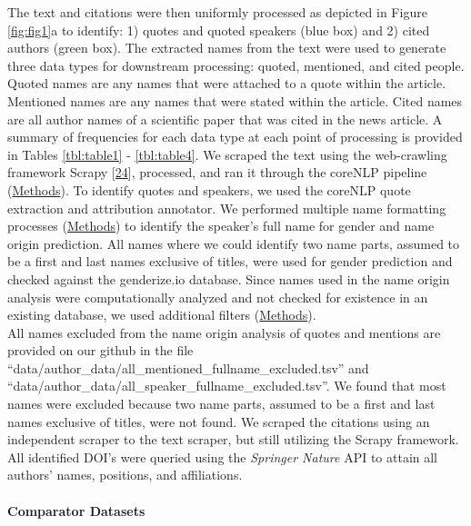The text and citations were then uniformly processed as depicted in Figure \ref{fig:fig1}a to identify: 1) quotes and quoted speakers (blue box) and 2) cited authors (green box).
The extracted names from the text were used to generate three data types for downstream processing: quoted, mentioned, and cited people.
Quoted names are any names that were attached to a quote within the article.
Mentioned names are any names that were stated within the article.
Cited names are all author names of a scientific paper that was cited in the news article.
A summary of frequencies for each data type at each point of processing is provided in Tables \ref{tbl:table1} - \ref{tbl:table4}.
We scraped the text using the web-crawling framework Scrapy {[}\protect\hyperlink{ref-mfJiAqsK}{24}{]}, processed, and ran it through the coreNLP pipeline (\protect\hyperlink{methods}{Methods}).
To identify quotes and speakers, we used the coreNLP quote extraction and attribution annotator.
We performed multiple name formatting processes (\protect\hyperlink{methods}{Methods}) to identify the speaker's full name for gender and name origin prediction.
All names where we could identify two name parts, assumed to be a first and last names exclusive of titles, were used for gender prediction and checked against the genderize.io database.
Since names used in the name origin analysis were computationally analyzed and not checked for existence in an existing database, we used additional filters (\protect\hyperlink{methods}{Methods}).\\
All names excluded from the name origin analysis of quotes and mentions are provided on our github in the file ``data/author\_data/all\_mentioned\_fullname\_excluded.tsv'' and ``data/author\_data/all\_speaker\_fullname\_excluded.tsv''.
We found that most names were excluded because two name parts, assumed to be a first and last names exclusive of titles, were not found.
We scraped the citations using an independent scraper to the text scraper, but still utilizing the Scrapy framework.
All identified DOI's were queried using the \emph{Springer Nature} API to attain all authors' names, positions, and affiliations.

\hypertarget{comparator-datasets}{%
\paragraph{Comparator Datasets}\label{comparator-datasets}}

